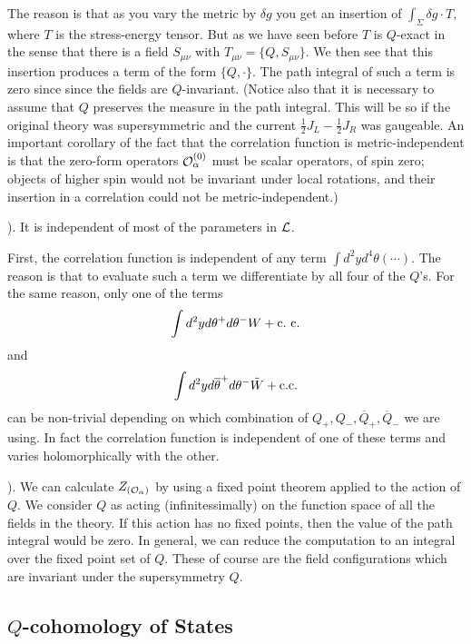 The reason is that as you vary the metric by $\delta g$ you get an
insertion of $\int_\Sigma\delta g\cdot T$, where $T$ is the
stress-energy tensor.
But as we have seen before $T$ is $Q$-exact in the sense
that there is a field $S_{\mu\nu}$ with  $T_{\mu\nu}=\{Q,S_{\mu\nu}\}$.  We
then see that  this insertion produces a term of the form $\{Q,\cdot\}$.
The path integral of such a term is zero since since the fields are
$Q$-invariant. (Notice also that it is necessary to assume that $Q$
preserves the measure in the path integral.  This will be so
if the original theory was supersymmetric and the current $\frac{1}{2} J_L-
\frac{1}{2} J_R$ was gaugeable.   An important
 corollary of the fact that the correlation
function is metric-independent is that the zero-form operators
${\cal O}_\alpha^{(0)}$ must be scalar operators, of spin zero;
objects of higher spin would not be invariant under local rotations,
and their insertion in a correlation could not be metric-independent.)





\bigskip
{}). It is independent of most of the parameters in ${\cal L}$.

First, the correlation function is independent of any term
$\int d^2yd^4\theta(\cdots)$. The reason is that to evaluate such a
term we differentiate by all four of the $Q$'s.
For the same reason, only one of the terms
$$\int d^2yd\theta^+d\theta^-W+{\rm c.\ c.}$$
and
$$\int d^2yd\overline\theta^+d\theta^-\tilde W+{\rm c. c.}$$
can be non-trivial depending on which combination of $Q_+,Q_-,\overline
Q_+,\overline Q_-$ we are using.
In fact the correlation function is independent of one of these terms
and varies holomorphically with the other.

\bigskip
{}). We can calculate $Z_{({\cal O}_\alpha)}$ by using a fixed point
theorem applied to the action of $Q$. We consider $Q$ as acting
(infinitessimally) on the
function space of all the fields in the theory.
If this action has no fixed points, then the value of the path
integral would be zero. In general, we can reduce the computation to
an integral over the fixed point set of $Q$.  These of course are the
field configurations which are invariant under the supersymmetry $Q$.

\subsection{$Q$-cohomology of States}

